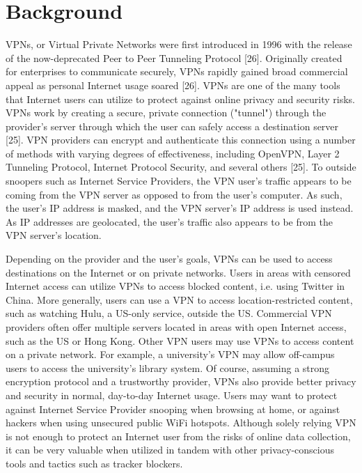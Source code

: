 \section{Background}\label{sec:background}
VPNs, or Virtual Private Networks were first introduced in 1996 with the release of the now-deprecated Peer
to Peer Tunneling Protocol [26]. Originally created for enterprises to
communicate securely, VPNs rapidly gained broad commercial appeal as personal
Internet usage soared [26]. VPNs are one of the many tools that Internet
users can utilize to protect against online privacy and security risks. VPNs
work by creating a secure, private connection ("tunnel") through the
provider's server through which the user can safely access a destination
server [25]. VPN providers can encrypt and authenticate this connection using
a number of methods with varying degrees of effectiveness, including OpenVPN,
Layer 2 Tunneling Protocol, Internet Protocol Security, and several others
[25]. To outside snoopers such as Internet Service Providers, the VPN user's
traffic appears to be coming from the VPN server as opposed to from the user's
computer. As such, the user's IP address is masked, and the VPN server's IP
address is used instead. As IP addresses are geolocated, the user's traffic
also appears to be from the VPN server's location.

Depending on the provider and the user's goals, VPNs can be used to access
destinations on the Internet or on private networks. Users in areas with
censored Internet access can utilize VPNs to access blocked content, i.e.
using Twitter in China. More generally, users can use a VPN to access
location-restricted content, such as watching Hulu, a US-only service, outside
the US. Commercial VPN providers often offer multiple servers located in areas
with open Internet access, such as the US or Hong Kong. Other VPN users may
use VPNs to access content on a private network. For example, a
university's VPN may allow off-campus users to access the university's library
system. Of course, assuming a strong encryption protocol and a trustworthy
provider, VPNs also provide better privacy and security in normal, day-to-day
Internet usage. Users may want to protect against Internet Service Provider
snooping when browsing at home, or against hackers when using unsecured public
WiFi hotspots. Although solely relying VPN is not enough to protect an
Internet user from the risks of online data collection, it can be very
valuable when utilized in tandem with other privacy-conscious tools and
tactics such as tracker blockers.


